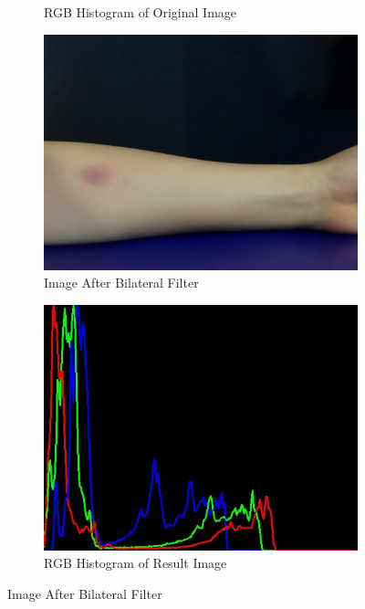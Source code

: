 \begin{figure}[!h]
\begin{subfigure}{.5\textwidth}
  \caption{RGB Histogram of Original Image}
  \label{fig:sub1}
\end{subfigure}
\begin{subfigure}{.5\textwidth}
  \centering
  \includegraphics[scale=0.23]{img/bilateral}
  \caption{Image After Bilateral Filter}
  \label{fig:sub2}
\end{subfigure}%
\begin{subfigure}{.5\textwidth}
  \centering
  \includegraphics[scale=0.43]{img/bilterrgb}
  \caption{RGB Histogram of Result Image}
  \label{fig:sub1}
\end{subfigure}
\label{fig:test}
\caption{Image After Bilateral Filter}
\end{figure}


